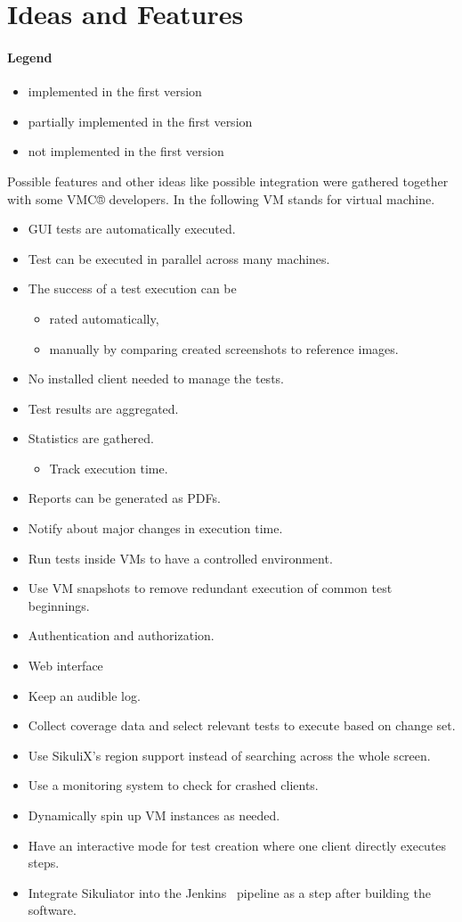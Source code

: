\documentclass[a4paper,twocolumn,twoside]{article}
\newcommand{\VMC}[0]{VMC®}
\newcommand{\Sik}[0]{Sikuliator}
\newcommand{\notImplemented}[0]{\item[$\times$] }
\newcommand{\partiallyImplemented}[0]{\item[$\boxdot$] }
\newcommand{\implemented}[0]{\item[\checkmark] }
\begin{document}
\section{Ideas and Features}
\paragraph{Legend}
\begin{itemize}
	\implemented implemented in the first version
	\partiallyImplemented partially implemented in the first version
	\notImplemented not implemented in the first version
\end{itemize}
	
	Possible features and other ideas like possible integration were gathered together with some \VMC{} developers.
	In the following VM stands for virtual machine.
	
\begin{itemize}
	\implemented GUI tests are automatically executed.
	\implemented Test can be executed in parallel across many machines.
	\partiallyImplemented The success of a test execution can be
	\begin{itemize}
		\implemented rated automatically,
		\notImplemented manually by comparing created screenshots to reference images.
	\end{itemize}
	\implemented No installed client needed to manage the tests.
	\implemented Test results are aggregated.
	\partiallyImplemented Statistics are gathered.
	\begin{itemize}
		\implemented Track execution time.
	\end{itemize}
	\notImplemented Reports can be generated as PDFs.
	\notImplemented Notify about major changes in execution time.
	\implemented Run tests inside VMs to have a controlled environment.
	\notImplemented Use VM snapshots to remove redundant execution of common test beginnings.
	\notImplemented Authentication and authorization.
	\partiallyImplemented Web interface
	\notImplemented Keep an audible log.
	\notImplemented Collect coverage data and select relevant tests to execute based on change set.
	\notImplemented Use SikuliX's region support instead of searching across the whole screen.
	\notImplemented Use a monitoring system to check for crashed clients.
	\notImplemented Dynamically spin up VM instances as needed.
	\notImplemented Have an interactive mode for test creation where one client directly executes steps.
	\notImplemented Integrate \Sik{} into the Jenkins~\cite{Jenkins} pipeline as a step after building the software.
\end{itemize}
\end{document}
